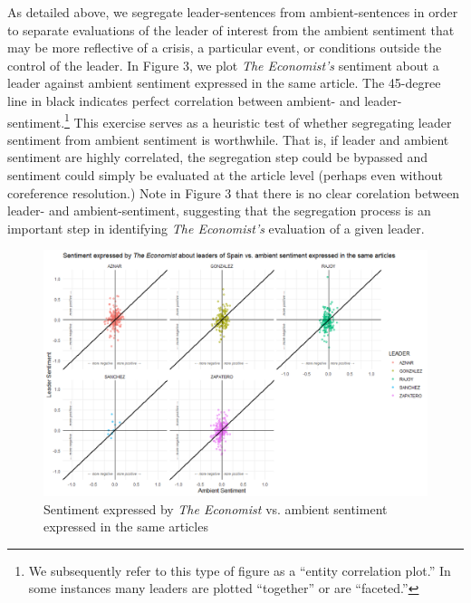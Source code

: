 \documentclass[11pt, letterpaper, twoside]{article}
\begin{document}
As detailed above, we segregate leader-sentences from ambient-sentences in order to separate evaluations of the leader of interest from the ambient sentiment that may be more reflective of a crisis, a particular event, or conditions outside the control of the leader. In Figure 3, we plot \textit{The Economist's} sentiment about a leader against ambient sentiment expressed in the same article. The 45-degree line in black indicates perfect correlation between ambient- and leader-sentiment.\footnote{We subsequently refer to this type of figure as a ``entity correlation plot.'' In some instances many leaders are plotted ``together'' or are ``faceted.''} This exercise serves as a heuristic test of whether segregating leader sentiment from ambient sentiment is worthwhile. That is, if leader and ambient sentiment are highly correlated, the segregation step could be bypassed and sentiment could simply be evaluated at the article level (perhaps even without coreference resolution.) Note in Figure 3 that there is no clear corelation between leader- and ambient-sentiment, suggesting that the segregation process is an important step in identifying \textit{The Economist's} evaluation of a given leader.\\

\begin{figure}
    \caption{Sentiment expressed by \textit{The Economist} vs. ambient sentiment expressed in the same articles}
    \centering
    \includegraphics[clip, width=\textwidth]{figures/230_corel_facet.png}
\end{figure}
\end{document}
